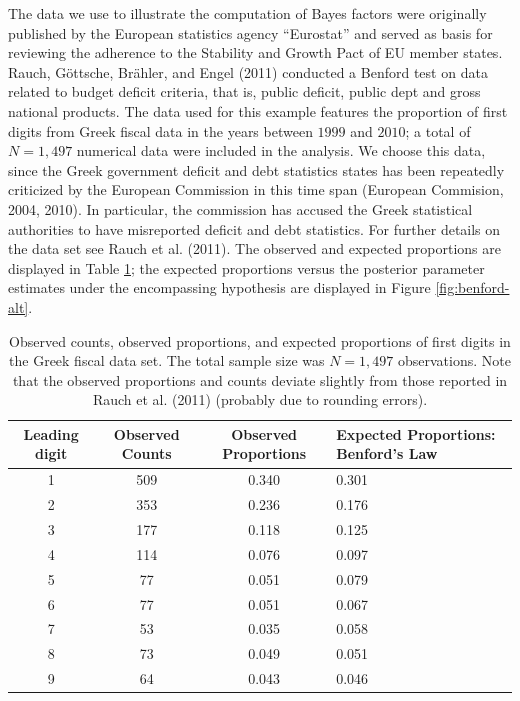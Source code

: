 \documentclass[
  english,
  man,floatsintext]{apa6}
\begin{document}
The data we use to illustrate the computation of Bayes factors were originally published by the European statistics agency \enquote{Eurostat} and served as basis for reviewing the adherence to the Stability and Growth Pact of EU member states. Rauch, Göttsche, Brähler, and Engel (2011) conducted a Benford test on data related to budget deficit criteria, that is, public deficit, public dept and gross national products. The data used for this example features the proportion of first digits from Greek fiscal data in the years between \(1999\) and \(2010\); a total of \(N= 1{,}497\) numerical data were included in the analysis. We choose this data, since the Greek government deficit and debt statistics states has been repeatedly criticized by the European Commission in this time span (European Commision, 2004, 2010). In particular, the commission has accused the Greek statistical authorities to have misreported deficit and debt statistics. For further details on the data set see Rauch et al. (2011). The observed and expected proportions are displayed in Table \ref{Tab:benford}; the expected proportions versus the posterior parameter estimates under the encompassing hypothesis are displayed in Figure \ref{fig:benford-alt}.

\begin{table}[H]
    \centering
    \caption{Observed counts, observed proportions, and expected proportions of first digits in the Greek fiscal data set. The total sample size was $N = 1{,}497$ observations. Note that the observed proportions and counts deviate slightly from those reported in Rauch et al. (2011) (probably due to rounding errors).}
    \begin{tabular}{cccp{4cm}}
        \hline
Leading digit & Observed Counts & Observed Proportions & Expected Proportions: Benford's Law  \\
        \hline
        1 & 509 & 0.340 & 0.301  \\
        2 & 353 & 0.236 & 0.176  \\
        3 & 177 & 0.118 & 0.125  \\
        4 & 114 & 0.076 & 0.097  \\
        5 & 77 & 0.051 & 0.079  \\
        6 & 77 & 0.051 & 0.067  \\
        7 & 53 & 0.035 & 0.058  \\
        8 & 73 & 0.049 & 0.051  \\
        9 & 64 & 0.043 & 0.046  \\
        \hline
    \end{tabular}
    \label{Tab:benford}
\end{table}
\end{document}
